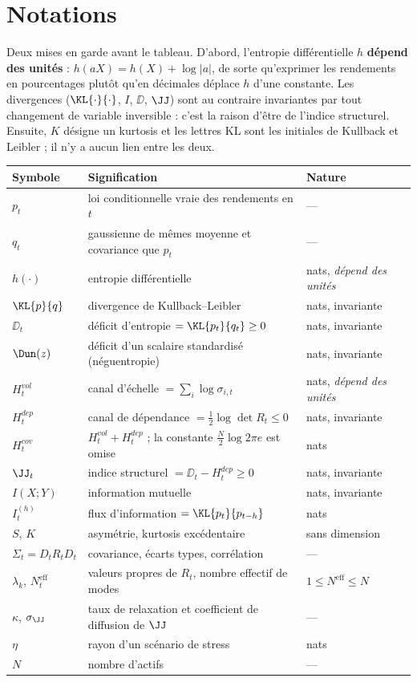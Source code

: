 \section*{Notations}

\noindent Deux mises en garde avant le tableau. D'abord, l'entropie
différentielle $h$ \textbf{dépend des unités} : $h(aX)=h(X)+\log|a|$, de sorte
qu'exprimer les rendements en pourcentages plutôt qu'en décimales déplace $h$
d'une constante. Les divergences ($\KL{\cdot}{\cdot}$, $I$, $\DD$, $\JJ$) sont au
contraire invariantes par tout changement de variable inversible : c'est la
raison d'être de l'indice structurel. Ensuite, $K$ désigne un kurtosis et les
lettres \og KL \fg{} sont les initiales de Kullback et Leibler ; il n'y a aucun
lien entre les deux.

\begin{center}
\small
\begin{tabular}{@{}lll@{}}
\toprule
Symbole & Signification & Nature \\
\midrule
$p_t$ & loi conditionnelle vraie des rendements en $t$ & --- \\
$q_t$ & gaussienne de mêmes moyenne et covariance que $p_t$ & --- \\
$h(\cdot)$ & entropie différentielle & nats, \emph{dépend des unités} \\
$\KL{p}{q}$ & divergence de Kullback--Leibler & nats, invariante \\
$\DD_t$ & déficit d'entropie $=\KL{p_t}{q_t}\ge0$ & nats, invariante \\
$\Dun(z)$ & déficit d'un scalaire standardisé (néguentropie) & nats, invariante \\
$H^{vol}_t$ & canal d'échelle $=\sum_i\log\sigma_{i,t}$ & nats, \emph{dépend des unités} \\
$H^{dep}_t$ & canal de dépendance $=\tfrac12\log\det R_t\le0$ & nats, invariante \\
$H^{cov}_t$ & $H^{vol}_t+H^{dep}_t$ ; la constante $\tfrac N2\log2\pi e$ est omise & nats \\
$\JJ_t$ & indice structurel $=\DD_t-H^{dep}_t\ge0$ & nats, invariante \\
$I(X;Y)$ & information mutuelle & nats, invariante \\
$I^{(h)}_t$ & flux d'information $=\KL{p_t}{p_{t-h}}$ & nats \\
$S$, $K$ & asymétrie, kurtosis excédentaire & sans dimension \\
$\Sigma_t=D_tR_tD_t$ & covariance, écarts types, corrélation & --- \\
$\lambda_k$, $N^{\text{eff}}_t$ & valeurs propres de $R_t$, nombre effectif de modes & $1\le N^{\text{eff}}\le N$ \\
$\kappa$, $\sigma_\JJ$ & taux de relaxation et coefficient de diffusion de $\JJ$ & --- \\
$\eta$ & rayon d'un scénario de stress & nats \\
$N$ & nombre d'actifs & --- \\
\bottomrule
\end{tabular}
\end{center}

